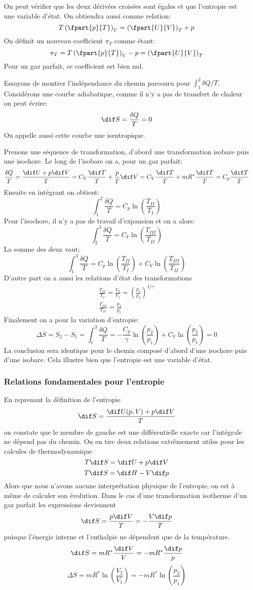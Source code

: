 On peut vérifier que les deux dérivées croisées sont égales et
que l'entropie est une variable d'état.
On obtiendra aussi comme relation:
\[ T\left(\fpart{p}{T}\right)_V =
\left(\fpart{U}{V}\right)_T+p \]
On définit un nouveau coefficient $\pi_T$ comme étant:
\[ \pi_T = T\left(\fpart{p}{T}\right)_V -p =
\left(\fpart{U}{V}\right)_T \]
Pour un gaz parfait, ce coefficient est bien nul.

Essayons de montrer l'indépendance du chemin parcouru
pour $\int_1^2 \delta Q/T$.
Considérons une courbe adiabatique,
comme il n'y a pas de transfert de chaleur on peut écrire:
\[ \dif S = \frac{\delta Q}{T} = 0 \]
On appelle aussi cette courbe une isentropique.

Prenons une séquence de transformation,
d'abord une transformation isobare puis une isochore.
Le long de l'isobare on a, pour un gaz parfait:
\[ \frac{\delta Q}{T} = \frac{\dif U+p\dif V}{T} =
C_V \frac{\dif T}{T}+\frac pT\dif V =
C_V \frac{\dif T}T+mR^*\frac{\dif T}T = C_p\frac{\dif T}T \]
Ensuite en intégrant on obtient:
\[ \int_1^2 \frac{\delta Q}T = C_p \ln \left (\frac{T_{II}}{T_{I}}\right) \]
Pour l'isochore, il n'y a pas de travail d'expansion et on a alors:
\[ \int_2^3 \frac{\delta Q}T = C_V \ln \left (\frac{T_{III}}{T_{II}}\right) \]
La somme des deux vaut:
\[ \int_1^3 \frac{\delta Q}T = C_p \ln \left (\frac{T_{II}}{T_{I}}\right)+
C_V \ln \left (\frac{T_{III}}{T_{II}}\right) \]
D'autre part on a aussi les relations d'état des transformations
\begin{align*}
  \frac{T_{II}}{T_I} = \frac{V_2}{V_1} =
  \left(\frac{p_1}{p_2}\right)^{1/\gamma}\\
  \frac{T_{III}}{T_{II}} = \frac {p_2}{p_1}
\end{align*}
Finalement on a pour la variation d'entropie:
\[ \Delta S = S_2-S_1 = \int_1^3 \frac{\delta Q}T =
-\frac{C_p}{\gamma} \ln \left(\frac{p_2}{p_1}\right) +
C_V \ln \left (\frac{p_2}{p_1}\right) = 0 \]
La conclusion sera identique pour le chemin composé d'abord
d'une isochore puis d'une isobare.
Cela illustre bien que l'entropie est une variable d'état.

\subsubsection{Relations fondamentales pour l'entropie}
En reprenant la définition de l'entropie
\[ \dif S = \frac{\dif U(p,V)+p\dif V}{T} \]
on constate que le membre de gauche est une différentielle exacte
car l'intégrale ne dépend pas du chemin.
On en tire deux relations extrêmement utiles
pour les calcules de thermodynamique
\[ T\dif S = \dif U+p\dif V \]
\[ T\dif S = \dif H-V\dif p \]
Alors que nous n'avons aucune interprétation physique de l'entropie,
on est à même de calculer son évolution.
Dans le cas d'une transformation isotherme
d'un gaz parfait les expressions deviennent
\[ \dif S = \frac{p\dif V}{T} = -\frac{V\dif p}{T} \]
puisque l'énergie interne et l'enthalpie ne dépendent que de la température.
\[ \dif S = mR^*\frac{\dif V}{V} = -mR^*\frac{\dif p}p \]
\[ \Delta S = mR^* \ln \left(\frac{V_2}{V_1}\right) =
-mR^* \ln \left(\frac{p_2}{p_1}\right) \]

